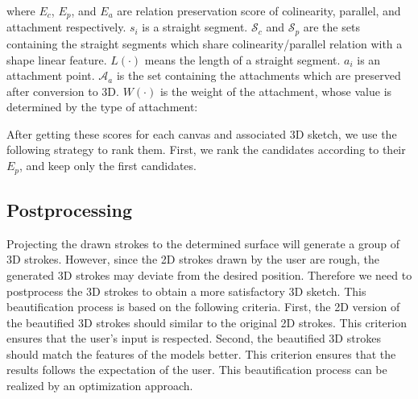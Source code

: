 where $E_c$, $E_p$, and $E_a$ are relation preservation score of colinearity, parallel, and attachment respectively. $s_i$ is a straight segment. $\mathcal{S}_c$ and $\mathcal{S}_p$ are the sets containing the straight segments which share colinearity/parallel relation with a shape linear feature. $L(\cdot)$ means the length of a straight segment. $a_i$ is an attachment point. $\mathcal{A}_a$ is the set containing the attachments which are preserved after conversion to 3D. $W(\cdot)$ is the weight of the attachment, whose value is determined by the type of attachment: 

After getting these scores for each canvas and associated 3D sketch, we use the following strategy to rank them. First, we rank the candidates according to their $E_p$, and keep only the first  candidates. 


\subsection{Postprocessing}

Projecting the drawn strokes to the determined surface will generate a group of 3D strokes. However, since the 2D strokes drawn by the user are rough, the generated 3D strokes may deviate from the desired position. Therefore we need to postprocess the 3D strokes to obtain a more satisfactory 3D sketch. This beautification process is based on the following criteria. First, the 2D version of the beautified 3D strokes should similar to the original 2D strokes. This criterion ensures that the user's input is respected. Second, the beautified 3D strokes should match the features of the models better. This criterion ensures that the results follows the expectation of the user.  This beautification process can be realized by an optimization approach.
